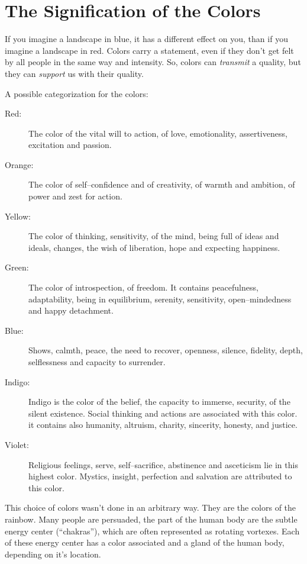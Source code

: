 \documentclass[../main.tex]{subfiles}
\begin{document}


\chapter{The Signification of the Colors}

If you imagine a landscape in blue, it has a different effect on you, than if you imagine a landscape in red. Colors carry a statement, even if they don't get felt by all people in the same way and intensity. So, colors can \emph{transmit} a quality, but they can \emph{support} us with their quality.

A possible categorization for the colors:

\begin{description}
\item[Red:] The color of the vital will to action, of love,  emotionality, assertiveness, excitation and passion.
\item[Orange:] The color of self--confidence and of creativity, of warmth and ambition, of power and zest for action.
\item[Yellow:] The color of thinking, sensitivity, of the mind, being full of ideas and ideals, changes, the wish of liberation, hope and expecting happiness.
\item[Green:] The color of introspection, of freedom. It contains peacefulness, adaptability, being in equilibrium, serenity, sensitivity, open--mindedness and happy detachment.
\item[Blue:] Shows, calmth, peace, the need to recover, openness, silence, fidelity, depth, selflessness and capacity to surrender.
\item[Indigo:] Indigo is the color of the belief, the capacity to immerse, security, of the silent existence. Social thinking and actions are associated with this color. it contains also humanity, altruism, charity, sincerity, honesty, and justice. 
  \item[Violet:] Religious feelings, serve, self--sacrifice, abstinence and asceticism lie in this highest color. Mystics, insight, perfection and salvation are attributed to this color.
  \end{description}

  This choice of colors wasn't done in an arbitrary way. They are the colors of the rainbow. Many people are persuaded, the part of the human body are the subtle energy center (``chakras''), which are often represented as rotating vortexes. Each of these energy center has a color associated and a gland of the human body, depending on it's location.
\end{document}
